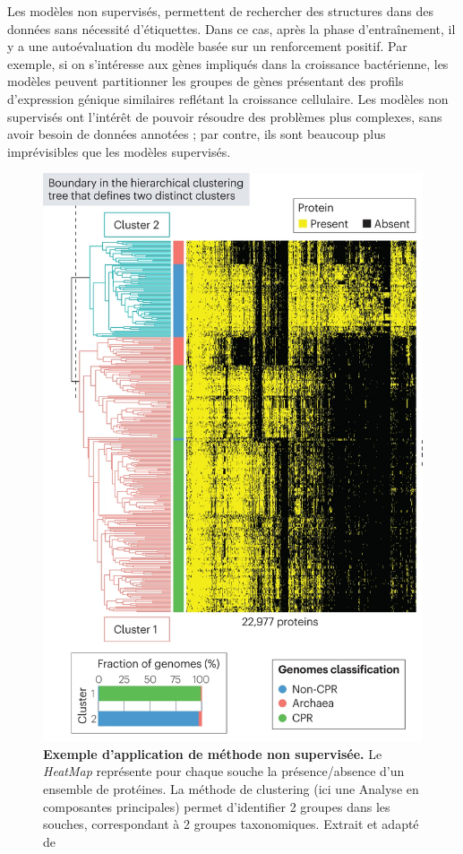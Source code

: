 Les modèles non supervisés, permettent de rechercher des structures dans des données sans nécessité d'étiquettes. Dans ce cas, après la phase d’entraînement, il y a une autoévaluation du modèle basée sur un renforcement positif. Par exemple, si on s'intéresse aux gènes impliqués dans la croissance bactérienne, les modèles peuvent partitionner les groupes de gènes présentant des profils d'expression génique similaires reflétant la croissance cellulaire. Les modèles non supervisés ont l'intérêt de pouvoir résoudre des problèmes plus complexes, sans avoir besoin de données annotées ; par contre, ils sont beaucoup plus imprévisibles que les modèles supervisés.

\begin{figure}[htbp]
    \centering
    \includegraphics[width=0.5\linewidth]{images/hierachical_clustering.png}
    \caption[Exemple d'application de méthode non supervisé]{\textbf{Exemple d'application de méthode non supervisée.} Le \textit{HeatMap} représente pour chaque souche la présence/absence d'un ensemble de protéines. La méthode de clustering (ici une Analyse en composantes principales) permet d'identifier 2 groupes dans les souches, correspondant à 2 groupes taxonomiques. Extrait et adapté de \cite{asnicar_machine_2024}}
    \label{fig:enter-label}
\end{figure}

